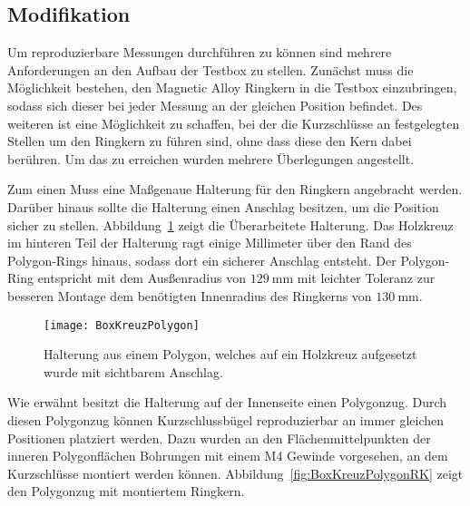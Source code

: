 


\subsection{Modifikation}
Um reproduzierbare Messungen durchf\"uhren zu k\"onnen sind mehrere Anforderungen an den Aufbau der Testbox zu stellen. Zun\"achst muss die M\"oglichkeit bestehen, den Magnetic Alloy Ringkern in die Testbox einzubringen, sodass sich dieser bei jeder Messung an der gleichen Position befindet. Des weiteren ist eine M\"oglichkeit zu schaffen, bei der die Kurzschl\"usse an festgelegten  Stellen um den Ringkern zu f\"uhren sind, ohne dass diese den Kern dabei ber\"uhren. Um das zu erreichen wurden mehrere \"Uberlegungen angestellt.
\par
Zum einen Muss eine Ma\ss{}genaue Halterung f\"ur den Ringkern angebracht werden. Dar\"uber hinaus sollte die Halterung einen Anschlag besitzen, um die Position sicher zu stellen. Abbildung~\ref{fig:BoxKreuzPolygon} zeigt die \"Uberarbeitete Halterung. Das Holzkreuz im hinteren Teil der Halterung ragt einige Millimeter \"uber den Rand des Polygon-Rings hinaus, sodass dort ein sicherer Anschlag entsteht. Der Polygon-Ring entspricht mit dem Aus\ss{}enradius von $\SI{129}{\milli\meter}$ mit leichter Toleranz zur besseren Montage dem ben\"otigten Innenradius des Ringkerns von $\SI{130}{\milli\meter}$.
\par
\begin{figure}[htb]
	\centering
	\texttt{[image: BoxKreuzPolygon]}
	\caption{Halterung aus einem Polygon, welches auf ein Holzkreuz aufgesetzt wurde mit sichtbarem Anschlag.}
	\label{fig:BoxKreuzPolygon}
\end{figure}
\par
Wie erw\"ahnt besitzt die Halterung auf der Innenseite einen Polygonzug. Durch diesen Polygonzug k\"onnen Kurzschlussb\"ugel reproduzierbar an immer gleichen Positionen platziert werden. Dazu wurden an den Fl\"achenmittelpunkten der inneren Polygonfl\"achen Bohrungen mit einem M4 Gewinde vorgesehen, an dem Kurzschl\"usse montiert werden k\"onnen. Abbildung~\ref{fig:BoxKreuzPolygonRK} zeigt den Polygonzug mit montiertem Ringkern.






